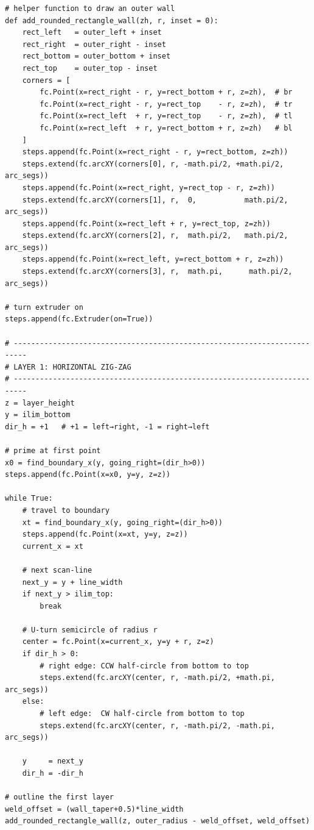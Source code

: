 \documentclass{ltxdoc}
\begin{document}
\begin{verbatim}
# helper function to draw an outer wall
def add_rounded_rectangle_wall(zh, r, inset = 0):
    rect_left   = outer_left + inset
    rect_right  = outer_right - inset
    rect_bottom = outer_bottom + inset
    rect_top    = outer_top - inset
    corners = [
        fc.Point(x=rect_right - r, y=rect_bottom + r, z=zh),  # br
        fc.Point(x=rect_right - r, y=rect_top    - r, z=zh),  # tr
        fc.Point(x=rect_left  + r, y=rect_top    - r, z=zh),  # tl
        fc.Point(x=rect_left  + r, y=rect_bottom + r, z=zh)   # bl
    ]
    steps.append(fc.Point(x=rect_right - r, y=rect_bottom, z=zh))
    steps.extend(fc.arcXY(corners[0], r, -math.pi/2, +math.pi/2, arc_segs))
    steps.append(fc.Point(x=rect_right, y=rect_top - r, z=zh))
    steps.extend(fc.arcXY(corners[1], r,  0,           math.pi/2, arc_segs))
    steps.append(fc.Point(x=rect_left + r, y=rect_top, z=zh))
    steps.extend(fc.arcXY(corners[2], r,  math.pi/2,   math.pi/2, arc_segs))
    steps.append(fc.Point(x=rect_left, y=rect_bottom + r, z=zh))
    steps.extend(fc.arcXY(corners[3], r,  math.pi,      math.pi/2, arc_segs))

# turn extruder on
steps.append(fc.Extruder(on=True))

# -------------------------------------------------------------------------
# LAYER 1: HORIZONTAL ZIG-ZAG
# -------------------------------------------------------------------------
z = layer_height
y = ilim_bottom
dir_h = +1   # +1 = left→right, -1 = right→left

# prime at first point
x0 = find_boundary_x(y, going_right=(dir_h>0))
steps.append(fc.Point(x=x0, y=y, z=z))

while True:
    # travel to boundary
    xt = find_boundary_x(y, going_right=(dir_h>0))
    steps.append(fc.Point(x=xt, y=y, z=z))
    current_x = xt

    # next scan-line
    next_y = y + line_width
    if next_y > ilim_top:
        break

    # U-turn semicircle of radius r
    center = fc.Point(x=current_x, y=y + r, z=z)
    if dir_h > 0:
        # right edge: CCW half-circle from bottom to top
        steps.extend(fc.arcXY(center, r, -math.pi/2, +math.pi, arc_segs))
    else:
        # left edge:  CW half-circle from bottom to top
        steps.extend(fc.arcXY(center, r, -math.pi/2, -math.pi, arc_segs))

    y     = next_y
    dir_h = -dir_h

# outline the first layer
weld_offset = (wall_taper+0.5)*line_width
add_rounded_rectangle_wall(z, outer_radius - weld_offset, weld_offset)


\end{verbatim}
\end{document}
